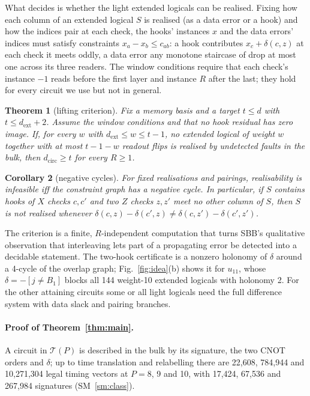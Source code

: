 \documentclass[aps,prl,twocolumn,superscriptaddress,nofootinbib]{revtex4-2}
\newif\ifshowclaimtags \showclaimtagsfalse
\newcommand{\cl}[1]{\ifshowclaimtags\textsuperscript{\textcolor{blue}{\scriptsize[#1]}}\fi}
\newcommand{\dcirc}{d_{\mathrm{circ}}}
\newcommand{\dext}{d_{\mathrm{ext}}}
\newcommand{\T}{\mathcal{T}}
\newtheorem{theorem}{Theorem}
\newtheorem{corollary}[theorem]{Corollary}
\begin{document}
What decides is whether the light extended logicals can be realised. Fixing how each
column of an extended logical $S$ is realised (as a data error or a hook) and how the
indices pair at each check, the hooks' instances $x$ and the data errors' indices must
satisfy constraints $x_a-x_b\le c_{ab}$: a hook contributes $x_c+\delta(c,z)$ at each check
it meets oddly, a data error any monotone staircase of drop at most one across its three
readers. The window conditions require that each check's instance $-1$ reads before the
first layer and instance $R$ after the last; they hold for every circuit we use but not
in general.

\begin{theorem}[lifting criterion]\label{thm:criterion}
Fix a memory basis and a target $t\le d$ with $t\le\dext+2$. Assume the window conditions
and that no hook residual has zero image. If, for every $w$ with $\dext\le w\le t-1$, no
extended logical of weight $w$ together with at most $t-1-w$ readout flips is realised by
undetected faults in the bulk, then $\dcirc\ge t$ for every $R\ge1$.
\end{theorem}
\begin{corollary}[negative cycles]\label{cor:cycle}
For fixed realisations and pairings, realisability is infeasible iff the constraint graph
has a negative cycle. In particular, if $S$ contains hooks of $X$ checks $c,c'$ and two $Z$
checks $z,z'$ meet no other column of $S$, then $S$ is not realised whenever
$\delta(c,z)-\delta(c',z)\neq\delta(c,z')-\delta(c',z')$.
\end{corollary}
\noindent The criterion is a finite, $R$-independent computation that turns
SBB's qualitative observation that interleaving lets part of a propagating error be
detected into a decidable statement\cl{L-13,L-14}. The two-hook certificate is a nonzero
holonomy of $\delta$ around a 4-cycle of the overlap graph; Fig.~\ref{fig:idea}(b) shows it
for $u_{11}$, whose $\delta=-[j\neq B_1]$ blocks all 144 weight-10 extended logicals with
holonomy 2\cl{L-9}. For the other attaining circuits some or all light logicals need the full
difference system with data slack and pairing branches.

\paragraph{Proof of Theorem~\ref{thm:main}.}
A circuit in $\T(P)$ is described in the bulk by its signature, the two CNOT orders and
$\delta$; up to time translation and relabelling there are 22,608, 784,944 and 10,271,304
legal timing vectors at $P=8$, 9 and 10, with 17,424, 67,536 and 267,984 signatures
(SM~\ref{sm:class})\cl{L-1}.
\end{document}
